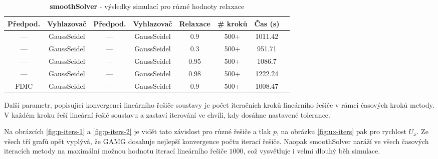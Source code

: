 \documentclass[a4paper,12pt]{report}
\theoremstyle{remark}
\begin{document}
\begin{table}[H]
	\centering
	\caption{\textbf{smoothSolver} - výsledky simulací pro různé hodnoty relaxace}
	\renewcommand{\arraystretch}{1.9}
	\begin{tabular}{*8c}
		\toprule
		Předpod.&Vyhlazovač&Předpod.&Vyhlazovač&Relaxace&\# kroků&Čas (s)\\
		\midrule
		--- & GaussSeidel &   --- & GaussSeidel &0.9&500+&1011.42\\
		--- & GaussSeidel &  --- & GaussSeidel &0.3&500+&951.71\\
		--- & GaussSeidel &   --- & GaussSeidel &0.95&500+&1086.7\\
		--- & GaussSeidel &  --- & GaussSeidel &0.98&500+&1222.24\\
		FDIC & GaussSeidel &  --- & GaussSeidel &0.9&500+&1008.47\\


		\bottomrule
	\end{tabular}
	\label{table:solvers_set3}
\end{table}

Další parametr, popisující konvergenci lineárního řešiče soustavy je počet iteračních kroků lineárního řešiče v rámci časových kroků metody. V každém kroku řeší lineární řešič soustavu a zastaví iterování ve chvíli, kdy dosáhne nastavené tolerance.

Na obrázcích \ref{fig:p-iters-1} a \ref{fig:p-iters-2} je vidět tato závislost pro různé řešiče a tlak $p$, na obrázku \ref{fig:ux-iters} pak pro rychlost $U_x$. Ze všech tří grafů opět vyplývá, že GAMG dosahuje nejlepší konvergence počtu iterací řešiče. Naopak smoothSolver naráží ve všech časových iteracích metody na maximální možnou hodnotu iterací lineárního řešiče $1000$, což vysvětluje i velmi dlouhý běh simulace.
\end{document}
